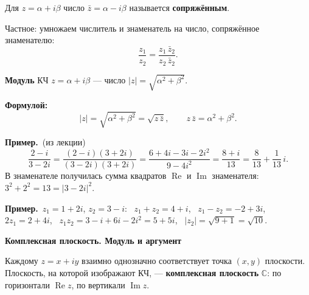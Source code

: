 \documentclass[a4paper,11pt]{article}
\newcommand{\C}{\mathbb{C}}
\DeclareMathOperator{\Rez}{Re}
\DeclareMathOperator{\Imz}{Im}
\newcommand{\fm}{\par\noindent\textbf{\textcolor{oprc!85!black}{Формулой:}}}
\newcommand{\prim}{\par\smallskip\noindent\textbf{\textcolor{teoc!80!black}{Пример.}}\ }
\newcommand{\podr}[1]{\par\needspace{8\baselineskip}\medskip
  {\large\bfseries\textcolor{oprc!80!black}{#1}}\par\nopagebreak\smallskip}
\begin{document}
\begin{opr}
Для $z = \alpha + i\beta$ число $\bar z = \alpha - i\beta$ называется \textbf{сопряжённым}.
\end{opr}

Частное: умножаем числитель и знаменатель на число, сопряжённое знаменателю:
\[
  \frac{z_1}{z_2} = \frac{z_1\, \bar z_2}{z_2\, \bar z_2}.
\]

\begin{opr}[модуль КЧ]
\textbf{Модуль} КЧ $z = \alpha + i\beta$ --- число $|z| = \sqrt{\alpha^2 + \beta^2}$.
\fm
\[
  |z| = \sqrt{\alpha^2 + \beta^2} = \sqrt{z\, \bar z}, \qquad z\, \bar z = \alpha^2 + \beta^2.
\]
\end{opr}

\prim (из лекции)
\[
  \frac{2 - i}{3 - 2i} = \frac{(2 - i)(3 + 2i)}{(3 - 2i)(3 + 2i)} = \frac{6 + 4i - 3i - 2i^2}{9 - 4i^2} = \frac{8 + i}{13} = \frac{8}{13} + \frac{1}{13}\, i.
\]
В знаменателе получилась сумма квадратов $\Rez$ и $\Imz$ знаменателя: $3^2 + 2^2 = 13 = |3 - 2i|^2$.

\prim $z_1 = 1 + 2i$, $z_2 = 3 - i$: \
$z_1 + z_2 = 4 + i$, \ $z_1 - z_2 = -2 + 3i$, \ $2z_1 = 2 + 4i$, \
$z_1 z_2 = 3 - i + 6i - 2i^2 = 5 + 5i$, \ $|z_2| = \sqrt{9 + 1} = \sqrt{10}$.

\podr{Комплексная плоскость. Модуль и аргумент}

Каждому $z = x + iy$ взаимно однозначно соответствует точка $(x, y)$ плоскости. Плоскость, на которой изображают КЧ, ---
\textbf{комплексная плоскость} $\C$: по горизонтали $\Rez z$, по вертикали $\Imz z$.

\begin{center}
\end{center}
\end{document}
